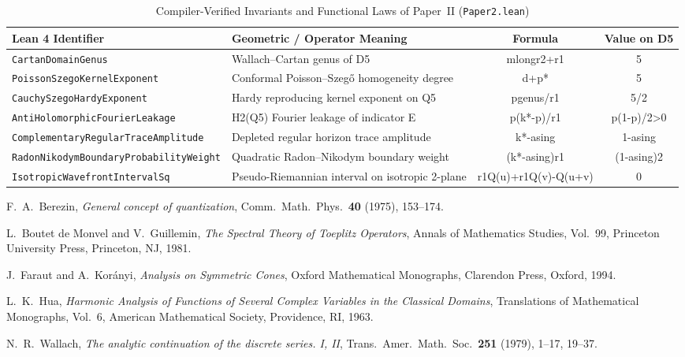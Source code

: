 \documentclass[11pt,reqno]{amsart}
\theoremstyle{definition}
\theoremstyle{remark}
\begin{document}
\begin{table}[htbp]
\centering
\caption{Compiler-Verified Invariants and Functional Laws of Paper~II (\texttt{Paper2.lean})}
\label{tab:paper2_ledger}
\renewcommand{\arraystretch}{1.25}
\begin{tabular}{@{}llcc@{}}
\toprule
\textbf{Lean 4 Identifier} & \textbf{Geometric / Operator Meaning} & \textbf{Formula} & \textbf{Value on D5} \\
\midrule
\texttt{CartanDomainGenus} & Wallach--Cartan genus of D5 & mlongr2+r1 & 5 \\
\texttt{PoissonSzegoKernelExponent} & Conformal Poisson--Szeg\H{o} homogeneity degree & d+p* & 5 \\
\texttt{CauchySzegoHardyExponent} & Hardy reproducing kernel exponent on Q5 & pgenus/r1 & 5/2 \\
\texttt{AntiHolomorphicFourierLeakage} & H2(Q5) Fourier leakage of indicator E & p(k*-p)/r1 & p(1-p)/2>0 \\
\texttt{ComplementaryRegularTraceAmplitude} & Depleted regular horizon trace amplitude & k*-asing & 1-asing \\
\texttt{RadonNikodymBoundaryProbabilityWeight} & Quadratic Radon--Nikodym boundary weight & (k*-asing)r1 & (1-asing)2 \\
\texttt{IsotropicWavefrontIntervalSq} & Pseudo-Riemannian interval on isotropic 2-plane & r1Q(u)+r1Q(v)-Q(u+v) & 0 \\
\bottomrule
\end{tabular}
\end{table}

\begin{thebibliography}{99}

F.~A.~Berezin, \emph{General concept of quantization}, Comm.\ Math.\ Phys.\ \textbf{40} (1975), 153--174.

L.~Boutet de Monvel and V.~Guillemin, \emph{The Spectral Theory of Toeplitz Operators}, Annals of Mathematics Studies, Vol.~99, Princeton University Press, Princeton, NJ, 1981.

J.~Faraut and A.~Kor\'anyi, \emph{Analysis on Symmetric Cones}, Oxford Mathematical Monographs, Clarendon Press, Oxford, 1994.

L.~K.~Hua, \emph{Harmonic Analysis of Functions of Several Complex Variables in the Classical Domains}, Translations of Mathematical Monographs, Vol.~6, American Mathematical Society, Providence, RI, 1963.

N.~R.~Wallach, \emph{The analytic continuation of the discrete series. I, II}, Trans.\ Amer.\ Math.\ Soc.\ \textbf{251} (1979), 1--17, 19--37.

\end{thebibliography}
\end{document}
